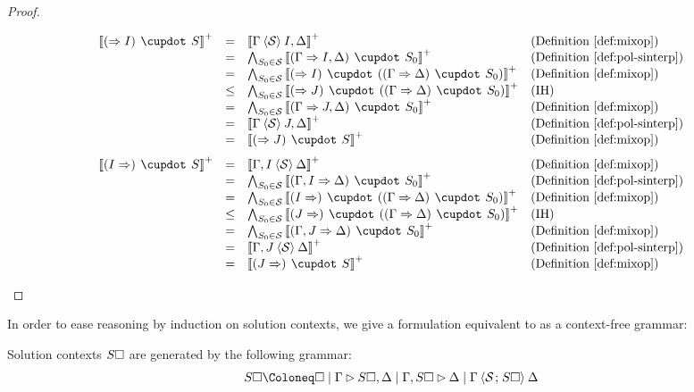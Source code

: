 \begin{proof}
\begin{itemize}
$$\begin{array}{rcll}
      \psint{(\seq I) \mix S}
      &=& \psint{\Gamma \piq{\mathcal{S}} I, \Delta} &\text{(\refdef{mixop})} \\
      &=& \bigwedge_{S_0 \in \mathcal{S}}{\psint{(\Gamma \seq I, \Delta) \mix S_0}} &\text{(\refdef{pol-sinterp})} \\
      &=& \bigwedge_{S_0 \in \mathcal{S}}{\psint{(\seq I) \mix ((\Gamma \seq \Delta) \mix S_0)}} &\text{(\refdef{mixop})} \\
      &\sement& \bigwedge_{S_0 \in \mathcal{S}}{\psint{(\seq J) \mix ((\Gamma \seq \Delta) \mix S_0)}} &\text{(IH)} \\
      &=& \bigwedge_{S_0 \in \mathcal{S}}{\psint{(\Gamma \seq J, \Delta) \mix S_0}} &\text{(\refdef{mixop})} \\
      &=& \psint{\Gamma \piq{\mathcal{S}} J, \Delta} &\text{(\refdef{pol-sinterp})} \\
      &=& \psint{(\seq J) \mix S} &\text{(\refdef{mixop})}
    \end{array}
    $$
    $$
    \begin{array}{rcll}
      \psint{(I \seq) \mix S}
      &=& \psint{\Gamma, I \piq{\mathcal{S}} \Delta} &\text{(\refdef{mixop})} \\
      &=& \bigwedge_{S_0 \in \mathcal{S}}{\psint{(\Gamma, I \seq \Delta) \mix S_0}} &\text{(\refdef{pol-sinterp})} \\
      &=& \bigwedge_{S_0 \in \mathcal{S}}{\psint{(I \seq) \mix ((\Gamma \seq \Delta) \mix S_0)}} &\text{(\refdef{mixop})} \\
      &\sement& \bigwedge_{S_0 \in \mathcal{S}}{\psint{(J \seq) \mix ((\Gamma \seq \Delta) \mix S_0)}} &\text{(IH)} \\
      &=& \bigwedge_{S_0 \in \mathcal{S}}{\psint{(\Gamma, J \seq \Delta) \mix S_0}} &\text{(\refdef{mixop})} \\
      &=& \psint{\Gamma, J \piq{\mathcal{S}} \Delta} &\text{(\refdef{pol-sinterp})} \\
      &=& \psint{(J \seq) \mix S} &\text{(\refdef{mixop})}
    \end{array}
    $$
  \end{itemize}
\end{proof}

In order to ease reasoning by induction on solution contexts, we give a
formulation equivalent to  as a context-free grammar:
\begin{fact}
  Solution contexts $S\square$ are generated by the following grammar:
  $$
    S\hole \Coloneq \hole \mid \Gamma \J S\hole, \Delta
                          \mid \Gamma, S\hole \J \Delta
                          \mid \Gamma \piq{\mathcal{S} \sep S\hole} \Delta
  $$
\end{fact}

